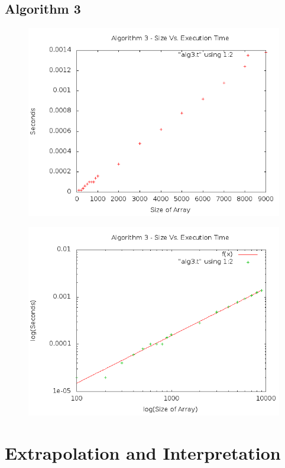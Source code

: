\documentclass[a4paper,10pt]{article}
\begin{document}
		\subsection{Algorithm 3}
\begin{figure}[!htb]
\centering
\includegraphics[scale=.5]{timingfiles/alg3plot.png}
\end{figure}
\begin{figure}[!htb]
\centering
\includegraphics[scale=.5]{timingfiles/alg3plotlog.png}
\end{figure}
\newpage

	\section{Extrapolation and Interpretation}
\end{document}
